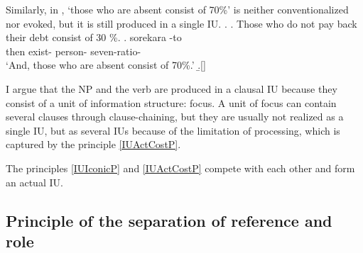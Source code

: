Similarly, in \Next[b],
 `those who are absent consist of 70\%'
is neither conventionalized nor evoked,
but it is still produced in a single IU.
%
\ex.
 \a. Those who do not pay back their debt consist of 30 \%.
 \bg. sorekara {\iub}   -to {\iub} \\
      then {} exist- person- seven-ratio- {} \\
      `And, those who are absent consist of 70\%.'
 \b.[] 

I argue that the NP and the verb are produced in a clausal IU
because they consist of a unit of information structure: focus.
A unit of focus can contain several clauses through clause-chaining,
but they are usually not realized as a single IU, but as several IUs
because of the limitation of processing,
which is captured by the principle \ref{IUActCostP}.

The principles \ref{IUIconicP} and \ref{IUActCostP} compete with each other and form an actual IU.



\subsection{Principle of the separation of reference and role}

